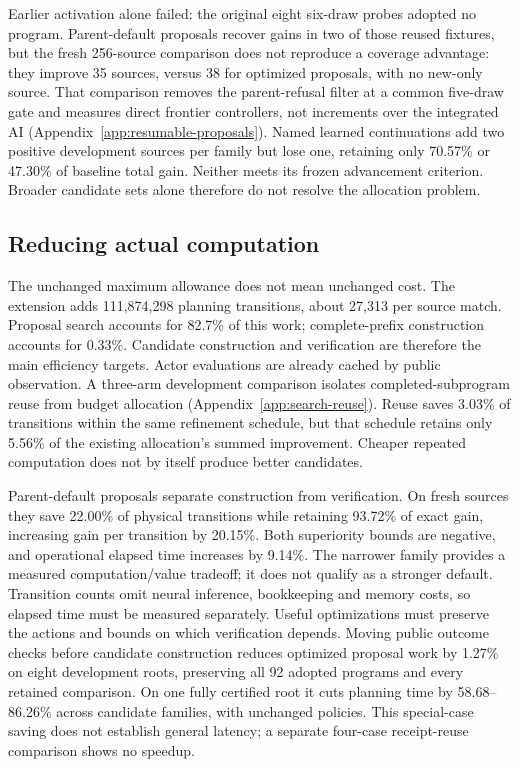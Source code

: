 \documentclass[11pt]{article}
\begin{document}
Earlier activation alone failed: the original eight six-draw probes adopted
no program. Parent-default proposals recover gains in two of those reused
fixtures, but the fresh 256-source comparison does not reproduce a coverage
advantage: they improve 35 sources, versus 38 for optimized proposals, with
no new-only source. That comparison removes the parent-refusal filter at a
common five-draw gate and measures direct frontier controllers, not increments
over the integrated AI (Appendix~\ref{app:resumable-proposals}).
Named learned continuations add two positive development sources per family
but lose one, retaining only 70.57\% or 47.30\% of baseline total gain.
Neither meets its frozen advancement criterion. Broader candidate sets alone
therefore do not resolve the allocation problem.

\subsection{Reducing actual computation}
The unchanged maximum allowance does not mean unchanged cost. The extension
adds 111,874,298 planning transitions, about 27,313 per source match. Proposal
search accounts for 82.7\% of this work; complete-prefix construction accounts
for 0.33\%. Candidate construction and verification are therefore the main
efficiency targets. Actor evaluations are already cached by public observation.
A three-arm development comparison isolates completed-subprogram reuse from
budget allocation (Appendix~\ref{app:search-reuse}). Reuse saves 3.03\% of
transitions within the same refinement schedule, but that schedule retains
only 5.56\% of the existing allocation's summed improvement. Cheaper repeated
computation does not by itself produce better candidates.

Parent-default proposals separate construction from verification. On fresh
sources they save 22.00\% of physical transitions while retaining 93.72\% of
exact gain, increasing gain per transition by 20.15\%. Both superiority bounds
are negative, and operational elapsed time increases by 9.14\%. The narrower
family provides a measured computation/value tradeoff; it does not qualify as
a stronger default. Transition counts omit neural inference, bookkeeping and
memory costs, so elapsed time must be measured separately. Useful optimizations
must preserve the actions and bounds on which verification depends. Moving public outcome checks before candidate construction reduces optimized
proposal work by 1.27\% on eight development roots, preserving all 92 adopted
programs and every retained comparison. On one fully certified root it cuts
planning time by 58.68--86.26\% across candidate families, with unchanged
policies. This special-case saving does not establish general latency;
a separate four-case receipt-reuse comparison shows no speedup.
\end{document}
